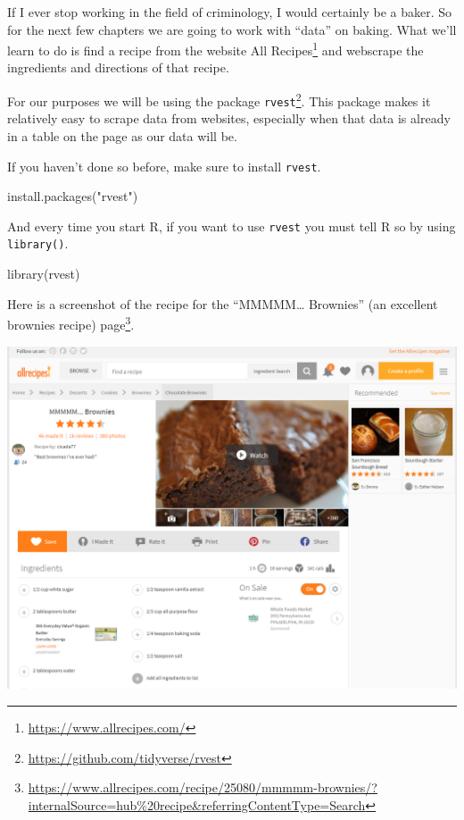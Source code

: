 \documentclass[
]{krantz}
\makeatletter
\newenvironment{Shaded}{\begin{snugshade}}{\end{snugshade}}
\newcommand{\FunctionTok}[1]{\textcolor[rgb]{0,0,0}{#1}}
\newcommand{\NormalTok}[1]{#1}
\newcommand{\StringTok}[1]{\textcolor[rgb]{0.5,0.5,0.5}{#1}}
\renewcommand{\href}[2]{#2\footnote{\url{#1}}}
\newenvironment{kframe}{%
\medskip{}
\setlength{\fboxsep}{.8em}
 \def\at@end@of@kframe{}%
 \ifinner\ifhmode%
  \def\at@end@of@kframe{\end{minipage}}%
  \begin{minipage}{\columnwidth}%
 \fi\fi%
 \def\FrameCommand##1{\hskip\@totalleftmargin \hskip-\fboxsep
 \colorbox{shadecolor}{##1}\hskip-\fboxsep
     \hskip-\linewidth \hskip-\@totalleftmargin \hskip\columnwidth}%
 \MakeFramed {\advance\hsize-\width
   \@totalleftmargin\z@ \linewidth\hsize
   \@setminipage}}%
 {\par\unskip\endMakeFramed%
 \at@end@of@kframe}
\renewenvironment{Shaded}{\begin{kframe}}{\end{kframe}}
\makeatother
\begin{document}
If I ever stop working in the field of criminology, I would certainly be a baker. So for the next few chapters we are going to work with ``data'' on baking. What we'll learn to do is find a recipe from the website \href{https://www.allrecipes.com/}{All Recipes} and webscrape the ingredients and directions of that recipe.

For our purposes we will be using the package \href{https://github.com/tidyverse/rvest}{\texttt{rvest}}. This package makes it relatively easy to scrape data from websites, especially when that data is already in a table on the page as our data will be.

If you haven't done so before, make sure to install \texttt{rvest}.

\begin{Shaded}
\begin{Highlighting}[]
\FunctionTok{install.packages}\NormalTok{(}\StringTok{"rvest"}\NormalTok{)}
\end{Highlighting}
\end{Shaded}

And every time you start R, if you want to use \texttt{rvest} you must tell R so by using \texttt{library()}.

\begin{Shaded}
\begin{Highlighting}[]
\FunctionTok{library}\NormalTok{(rvest)}
\end{Highlighting}
\end{Shaded}

Here is a screenshot of the recipe for the ``MMMMM\ldots{} Brownies'' (an excellent brownies recipe) \href{https://www.allrecipes.com/recipe/25080/mmmmm-brownies/?internalSource=hub\%20recipe\&referringContentType=Search}{page}.

\includegraphics{images/brownies_1.PNG}
\end{document}
